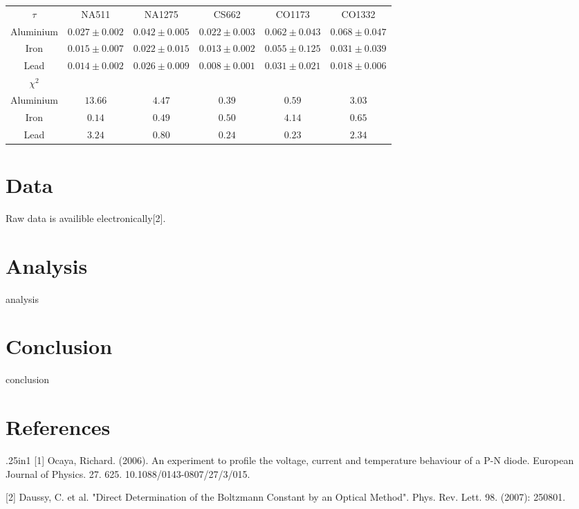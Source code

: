 \documentclass[12pt, a4paper]{article}
\begin{document}
	\small{
		\begin{center}
			\begin{tabular}{ ||c|c|c|c|c|c|| }
				$\tau$ & NA511 & NA1275 & CS662 & CO1173 & CO1332\\ 
				Aluminium & $0.027\pm0.002$ & $0.042\pm0.005$ & $0.022\pm0.003$ & $0.062\pm0.043$ & $0.068\pm0.047$\\
				Iron & $0.015\pm0.007$ & $0.022\pm0.015$ & $0.013\pm0.002$ & $0.055\pm0.125$ & $0.031\pm0.039$\\
				Lead & $0.014\pm0.002$ & $0.026\pm0.009$ & $0.008\pm0.001$ & $0.031\pm0.021$ & $0.018\pm0.006$\\
				$\chi^2$ & & & & & \\ 
				Aluminium & $13.66$ & $4.47$ & $0.39$ & $0.59$ & $3.03$\\
				Iron & $0.14$ & $0.49$ & $0.50$ & $4.14$ & $0.65$\\
				Lead & $3.24$ & $0.80$ & $0.24$ & $0.23$ & $2.34$\\
			\end{tabular}
		\end{center}
	}

\section{Data}
	Raw data is availible electronically[2].

\section{Analysis}
	analysis

\section{Conclusion}
	conclusion

\section*{References}

	\begin{hangparas}{.25in}{1}
		[1] Ocaya, Richard. (2006). An experiment to profile the voltage, current and temperature behaviour of a P-N diode. European Journal of Physics. 27. 625. 10.1088/0143-0807/27/3/015.
		
		[2] Daussy, C. et al. "Direct Determination of the Boltzmann Constant by an Optical Method". Phys. Rev. Lett. 98. (2007): 250801.
	\end{hangparas}
\end{document}
